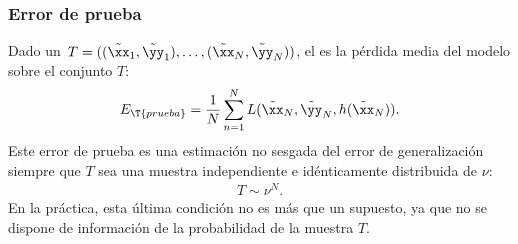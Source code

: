 %
\subsubsection{Error de prueba}
%
Dado un 
$\,T=((\tilde{\xx}_1,\tilde{\yy}_1),\ldots,(\tilde{\xx}_N,\tilde{\yy}_N))$, el
 es la pérdida media del modelo sobre el conjunto $T$:
%
\begin{align}
  E_{\T{prueba}}=\frac{1}{N}\sum_{n=1}^N
  L(\tilde{\xx}_N,\tilde{\yy}_N,h(\tilde{\xx}_N)).
  \label{eq:error-prueba}
\end{align}
%
Este error de prueba es una estimación no sesgada del error de
generalización siempre que $T$ sea una muestra independiente e
idénticamente distribuida de $\nu$:
%
\begin{align}
  T\sim\nu^N.
  \label{eq:conj-prueba-sim-nu}
\end{align}
%
En la práctica, esta última condición no es más que un supuesto,
ya que no se dispone de información de la probabilidad
de la muestra $T$.

